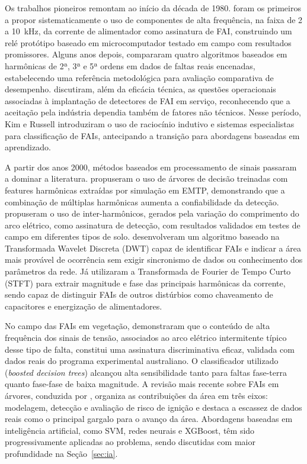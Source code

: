 Os trabalhos pioneiros remontam ao início da década de 1980.  foram os
primeiros a propor sistematicamente o uso de componentes de alta frequência, na faixa
de 2 a 10~kHz, da corrente de alimentador como assinatura de FAI, construindo um
relé protótipo baseado em microcomputador testado em campo com resultados promissores.
Alguns anos depois,  compararam quatro algoritmos baseados em
harmônicas de 2ª, 3ª e 5ª ordens em dados de faltas reais encenadas, estabelecendo
uma referência metodológica para avaliação comparativa de desempenho. 
discutiram, além da eficácia técnica, as questões operacionais associadas à
implantação de detectores de FAI em serviço, reconhecendo que a aceitação pela
indústria dependia também de fatores não técnicos. Nesse período, Kim e Russell
\cite{KimRussell1989} introduziram o uso de raciocínio indutivo e sistemas especialistas
para classificação de FAIs, antecipando a transição para abordagens baseadas em
aprendizado.

A partir dos anos 2000, métodos baseados em processamento de sinais passaram a
dominar a literatura.  propuseram o uso de árvores de decisão treinadas
com features harmônicas extraídas por simulação em EMTP, demonstrando que a
combinação de múltiplas harmônicas aumenta a confiabilidade da detecção.
 propuseram o uso de inter-harmônicos, gerados pela
variação do comprimento do arco elétrico, como assinatura de detecção, com
resultados validados em testes de campo em diferentes tipos de solo.
 desenvolveram um algoritmo baseado na Transformada Wavelet Discreta
(DWT) capaz de identificar FAIs e indicar a área mais provável de ocorrência sem
exigir sincronismo de dados ou conhecimento dos parâmetros da rede. Já 
utilizaram a Transformada de Fourier de Tempo Curto (STFT) para extrair magnitude e
fase das principais harmônicas da corrente, sendo capaz de distinguir FAIs de outros
distúrbios como chaveamento de capacitores e energização de alimentadores.

No campo das FAIs em vegetação,  demonstraram que o conteúdo de alta
frequência dos sinais de tensão, associados ao arco elétrico intermitente típico
desse tipo de falta, constitui uma assinatura discriminativa eficaz, validada com
dados reais do programa experimental australiano. O classificador utilizado (\textit{boosted
decision trees}) alcançou alta sensibilidade tanto para faltas fase-terra quanto
fase-fase de baixa magnitude. A revisão mais recente sobre FAIs em árvores, conduzida
por , organiza as contribuições da área em três eixos:
modelagem, detecção e avaliação de risco de ignição e destaca a escassez de
dados reais como o principal gargalo para o avanço da área. Abordagens baseadas em
inteligência artificial, como SVM, redes neurais e XGBoost, têm sido progressivamente
aplicadas ao problema, sendo discutidas com maior profundidade na
Seção~\ref{sec:ia}.

